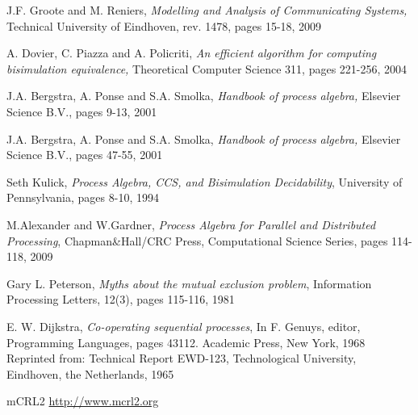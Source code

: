 \begin{thebibliography}{1}
J.F. Groote and M. Reniers, 
\emph{Modelling and Analysis of Communicating Systems}\emph, 
Technical University of Eindhoven, rev. 1478, pages 15-18, 2009

A. Dovier, C. Piazza and A. Policriti, 
\emph{An efficient algorithm for computing bisimulation equivalence}\emph, 
Theoretical Computer Science 311, pages 221-256, 2004

J.A. Bergstra, A. Ponse and S.A. Smolka, 
\emph{Handbook of process algebra}\emph, 
Elsevier Science B.V., pages 9-13, 2001

J.A. Bergstra, A. Ponse and S.A. Smolka, 
\emph{Handbook of process algebra}\emph, 
Elsevier Science B.V., pages 47-55, 2001

Seth Kulick,
\emph{Process Algebra, CCS, and Bisimulation Decidability},
University of Pennsylvania, pages 8-10, 1994

M.Alexander and W.Gardner,
\emph{Process Algebra for Parallel and Distributed Processing},
Chapman\&Hall/CRC Press, Computational Science Series, pages 114-118, 2009

Gary L. Peterson,
\emph{Myths about the mutual exclusion problem}, 
Information Processing Letters, 12(3), pages 115-116, 1981

E. W. Dijkstra,
\emph{Co-operating sequential processes}, 
In F. Genuys, editor, Programming Languages, pages 43112. Academic Press, New York, 1968
Reprinted from: Technical Report EWD-123, Technological University, Eindhoven, the Netherlands, 1965

mCRL2
\newline \url{http://www.mcrl2.org}

\end{thebibliography}